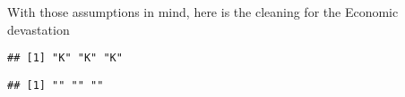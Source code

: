 \documentclass[
]{article}
\newenvironment{Shaded}{\begin{snugshade}}{\end{snugshade}}
\newcommand{\DecValTok}[1]{\textcolor[rgb]{0.00,0.00,0.81}{#1}}
\newcommand{\FunctionTok}[1]{\textcolor[rgb]{0.00,0.00,0.00}{#1}}
\newcommand{\NormalTok}[1]{#1}
\newcommand{\SpecialCharTok}[1]{\textcolor[rgb]{0.00,0.00,0.00}{#1}}
\begin{document}
With those assumptions in mind, here is the cleaning for the Economic
devastation

\begin{Shaded}
\end{Shaded}

\begin{verbatim}
## [1] "K" "K" "K"
\end{verbatim}

\begin{Shaded}
\end{Shaded}

\begin{verbatim}
## [1] "" "" ""
\end{verbatim}
\end{document}
